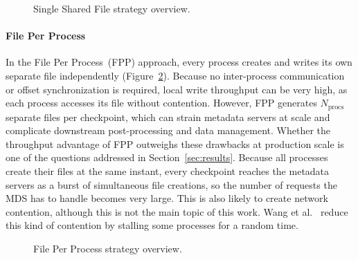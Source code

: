 \begin{figure}[h]
  \centering
  
  \caption{Single Shared File strategy overview.}
  \label{fig:ssf_schema}
\end{figure}

\FloatBarrier
\paragraph{File Per Process}
\label{sec:fpp}
In the File Per Process~(FPP) approach, every process creates and writes its
own separate file independently (Figure~\ref{fig:fpp_schema}). Because no
inter-process communication or offset synchronization is required, local write
throughput can be very high, as each process accesses its file without contention.
However, FPP generates $N_{\text{procs}}$ separate files per checkpoint, which can
strain metadata servers at scale and complicate downstream post-processing and data
management. Whether the throughput advantage of FPP outweighs these drawbacks at
production scale is one of the questions addressed in Section~\ref{sec:results}.
Because all processes create their files at the same instant, every checkpoint reaches
the metadata servers as a burst of simultaneous file creations, so the number of
requests the MDS has to handle becomes very large. This is also likely to create
network contention, although this is not the main topic of this work. Wang et
al.~\cite{wang2018mitigating} reduce this kind of contention by stalling some processes
for a random time.

\begin{figure}[htbp]
  \centering
  
  \caption{File Per Process strategy overview.}
  \label{fig:fpp_schema}
\end{figure}

\FloatBarrier
